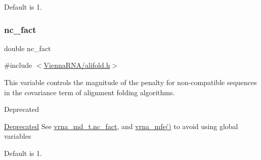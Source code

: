 Default is 1. \mbox{\label{group__consensus__fold_ga502948a122a2af5b914355b1f3ea2f61}} 
\subsubsection{\texorpdfstring{nc\+\_\+fact}{nc\_fact}}
{\footnotesize\ttfamily double nc\+\_\+fact}



{\ttfamily \#include $<$\hyperlink{alifold_8h}{Vienna\+R\+N\+A/alifold.\+h}$>$}



This variable controls the magnitude of the penalty for non-\/compatible sequences in the covariance term of alignment folding algorithms. 

\begin{DoxyRefDesc}{Deprecated}
\item[\hyperlink{deprecated__deprecated000017}{Deprecated}]See \hyperlink{group__model__details_abcf568e6124bfcb2f847ff4eb0dfded6}{vrna\+\_\+md\+\_\+t.\+nc\+\_\+fact}, and \hyperlink{group__mfe__fold_gabd3b147371ccf25c577f88bbbaf159fd}{vrna\+\_\+mfe()} to avoid using global variables\end{DoxyRefDesc}


Default is 1. 